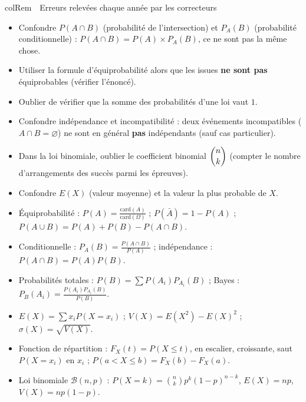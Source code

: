 \documentclass[11pt,a4paper]{article}
\newenvironment{remarque}[1][Remarque]
  {\begin{fiche}{colRem}{\ding{43}~~#1}}{\end{fiche}}
\begin{document}
\begin{remarque}[Erreurs relevées chaque année par les correcteurs]
\begin{itemize}[leftmargin=6mm, itemsep=0.5mm]
  \item Confondre $P(A\cap B)$ (probabilité de l'intersection) et $P_A(B)$ (probabilité conditionnelle) : $P(A\cap B)=P(A)\times P_A(B)$, ce ne sont pas la même chose.
  \item Utiliser la formule d'équiprobabilité alors que les issues \textbf{ne sont pas} équiprobables (vérifier l'énoncé).
  \item Oublier de vérifier que la somme des probabilités d'une loi vaut $1$.
  \item Confondre indépendance et incompatibilité : deux événements incompatibles ($A\cap B=\varnothing$) ne sont en général \textbf{pas} indépendants (sauf cas particulier).
  \item Dans la loi binomiale, oublier le coefficient binomial $\dbinom nk$ (compter le nombre d'arrangements des succès parmi les épreuves).
  \item Confondre $E(X)$ (valeur moyenne) et la valeur la plus probable de $X$.
\end{itemize}
\end{remarque}

\vspace{4mm}
\begin{tcolorbox}[
  enhanced, boxrule=0pt, arc=2mm,
  interior style={left color=qtealdark, right color=qteal},
  left=6mm, right=6mm, top=4mm, bottom=4mm,
  fontupper=\color{white}\sffamily,
  title={\sffamily\bfseries\color{white}\ding{72}~~À retenir},
  colbacktitle=qtealdark, coltitle=white, boxrule=0pt
]
\begin{itemize}[leftmargin=6mm, label={\color{qamber}}, itemsep=1mm]
  \item Équiprobabilité : $P(A)=\frac{\text{card}(A)}{\text{card}(\Omega)}$ ; $P(\bar A)=1-P(A)$ ; $P(A\cup B)=P(A)+P(B)-P(A\cap B)$.
  \item Conditionnelle : $P_A(B)=\frac{P(A\cap B)}{P(A)}$ ; indépendance : $P(A\cap B)=P(A)P(B)$.
  \item Probabilités totales : $P(B)=\sum P(A_i)P_{A_i}(B)$ ; Bayes : $P_B(A_i)=\frac{P(A_i)P_{A_i}(B)}{P(B)}$.
  \item $E(X)=\sum x_iP(X=x_i)$ ; $V(X)=E(X^2)-E(X)^2$ ; $\sigma(X)=\sqrt{V(X)}$.
  \item Fonction de répartition : $F_X(t)=P(X\leq t)$, en escalier, croissante, saut $P(X=x_i)$ en $x_i$ ; $P(a<X\leq b)=F_X(b)-F_X(a)$.
  \item Loi binomiale $\mathcal{B}(n,p)$ : $P(X=k)=\binom nkp^k(1-p)^{n-k}$, $E(X)=np$, $V(X)=np(1-p)$.
\end{itemize}
\end{tcolorbox}
\end{document}
